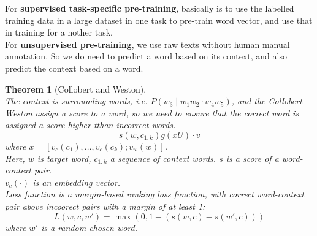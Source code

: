 \documentclass[12pt]{article}
\newtheorem{theorem}{Theorem}[section]
\theoremstyle{definition}
\begin{document}
For \textbf{supervised task-specific pre-training}, basically is to use the labelled training data in a large dataset in one task to pre-train word vector, and use that in training for a nother task.\\

For \textbf{unsupervised pre-training}, we use raw texts without human manual annotation. So we do need to predict a word based on its context, and also predict the context based on a word.
\begin{theorem}[Collobert and Weston]
\hfill\\\normalfont The context is surrounding words, i.e. $P(w_3\mid w_1w_2\cdot w_4w_5)$, and the Collobert Weston assign a score to a word, so we need to ensure that the correct word is assigned a score higher tthan incorrect words.
\[
s(w, c_{1:k})g(xU)\cdot v
\]
where $x=[v_c(c_1),\ldots, v_c(c_k); v_w(w)]$.\\
Here, $w$ is target word, $c_{1:k}$ a sequence of context words. $s$ is a score of a word-context pair.\\
$v_c(\cdot)$ is an embedding vector.\\
Loss function is a margin-based ranking loss function, with correct word-context pair above incoorect pairs with a margin of at least 1:
\[
L(w,c,w') = \max(0, 1-(s(w, c) - s(w', c)))
\] 
where $w'$ is a random chosen word.
\end{theorem}
\end{document}
